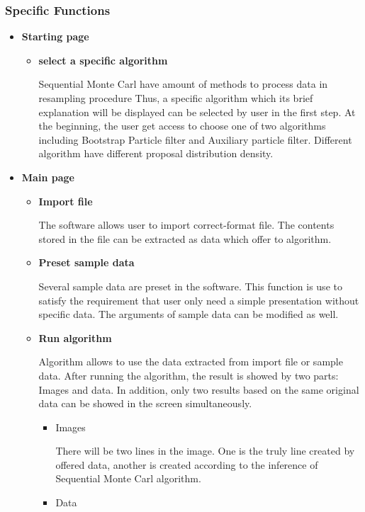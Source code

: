 \documentclass[11pt,oneside,a4paper]{article}
\begin{document}
    \subsubsection{Specific Functions}
       \begin{itemize}
       \item\textbf{Starting page}
        \begin{itemize}
          \item \textbf{select a specific algorithm}

          Sequential Monte Carl have amount of methods to process data in resampling procedure %
          Thus, a specific algorithm which its brief explanation will be displayed can be selected by user in the first step.
          At the beginning, the user get access to choose one of two algorithms including Bootstrap Particle filter and
          Auxiliary particle filter. Different algorithm have different proposal distribution density.
      \end{itemize}
      \item\textbf{Main page}
      \begin{itemize}
          \item \textbf{Import file}

          The software allows user to import correct-format file. The contents stored in the file can be extracted as data which offer to algorithm.
          \item \textbf{Preset sample data}

          Several sample data are preset in the software. This function is use to satisfy the requirement that user only need a simple presentation without specific data. The arguments of sample data can be modified as well.
          \item \textbf{Run algorithm}

          Algorithm allows to use the data extracted from import file or sample data. After running the algorithm, the result is showed by two parts: Images and data. In addition, only two results based on the same original data can be showed in the screen simultaneously.
          \begin{itemize}
            \item Images

            There will be two lines in the image. One is the truly line created by offered data, another is created according to the inference of Sequential Monte Carl algorithm.%
            \item Data


\end{itemize}
\end{itemize}
\end{itemize}
\end{document}
